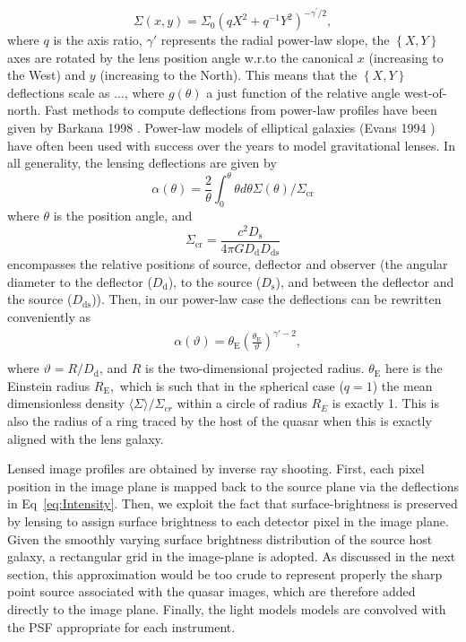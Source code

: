 \documentclass[a4paper,11pt]{article}
\begin{document}
\begin{equation}
\Sigma(x,y)=\Sigma_{0}(q X^{2}+q^{-1}Y^{2})^{-\gamma^{\prime}/2},
\end{equation}
%
where $q$ is the axis ratio, $\gamma'$ represents the radial power-law
slope, the $\left\{X,Y\right\}$ axes are rotated by the lens position
angle w.r.to the canonical $x$ (increasing to the West) and $y$
(increasing to the North). This means that the $\left\{X,Y\right\}$
deflections scale as ..., where $g(\theta)$ a just function of the
relative angle west-of-north. Fast methods to compute deflections from
power-law profiles have been given by Barkana 1998
\cite{1998ApJ...502..531B}. Power-law models of elliptical galaxies
(Evans 1994 \cite{1994MNRAS.267..333E}) have often been used with
success over the years to model gravitational lenses. In all
generality, the lensing deflections are given by
%
\begin{equation}
\alpha(\theta) = \frac{2}{\theta} \int_{0}^{\theta} \theta d\theta \Sigma (\theta) /\Sigma_{\mathrm{cr}}
\end{equation}
%
where $\theta$ is the position angle, and 
%
\begin{equation}
\Sigma_{\mathrm{cr}} = \frac{c^{2}D_{\mathrm{s}}}{4\pi G D_{\mathrm{d}} D_{\mathrm{ds}}}
\end{equation}
%
encompasses the relative positions of source, deflector and observer
(the angular diameter to the deflector ($D_{\mathrm{d}}$), to the
source ($D_{\mathrm{s}}$), and between the deflector and the source
($D_{\mathrm{ds}}$)). Then, in our power-law case the deflections can
be rewritten conveniently as
%
\begin{eqnarray}
   \label{eq:Intensity}
   &\alpha(\vartheta) = \theta_{\mathrm{E}}\left(\frac{\theta_{\mathrm{E}}}{\vartheta}\right)^{\gamma'-2} ,\\  
\end{eqnarray}
%
where $\vartheta = R/D_{\mathrm{d}}$, and $R$ is the two-dimensional
projected radius. $\theta_{\mathrm{E}}$ here is the Einstein radius
$R_{\mathrm{E}},$ which is such that in the spherical case ($q=1$) the
mean dimensionless density $\langle\Sigma\rangle/\Sigma_{cr}$ within a
circle of radius $R_E$ is exactly 1. This is also the radius of a ring
traced by the host of the quasar when this is exactly aligned with the
lens galaxy.

Lensed image profiles are obtained by inverse ray shooting. First,
each pixel position in the image plane is mapped back to the source
plane via the deflections in Eq~\ref{eq:Intensity}. Then, we exploit
the fact that surface-brightness is preserved by lensing to assign
surface brightness to each detector pixel in the image plane. Given
the smoothly varying surface brightness distribution of the source
host galaxy, a rectangular grid in the image-plane is adopted. As
discussed in the next section, this approximation would be too crude
to represent properly the sharp point source associated with the
quasar images, which are therefore added directly to the image plane.
Finally, the light models models are convolved with the PSF
appropriate for each instrument.
\end{document}
